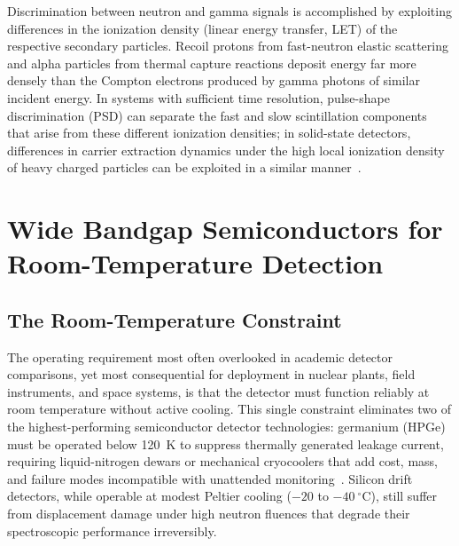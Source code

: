 Discrimination between neutron and gamma signals is accomplished
by exploiting differences in the ionization density (linear energy
transfer, LET) of the respective secondary particles.  Recoil protons
from fast-neutron elastic scattering and alpha particles from thermal
capture reactions deposit energy far more densely than the Compton
electrons produced by gamma photons of similar incident energy.  In
systems with sufficient time resolution, pulse-shape discrimination
(PSD) can separate the fast and slow scintillation components that
arise from these different ionization densities; in solid-state detectors,
differences in carrier extraction dynamics under the high local ionization
density of heavy charged particles can be exploited in a similar
manner~\cite{knoll2010}.

\section{Wide Bandgap Semiconductors for Room-Temperature Detection}
\label{sec:wide_bandgap}

\subsection{The Room-Temperature Constraint}

The operating requirement most often overlooked in academic detector
comparisons, yet most consequential for deployment in nuclear plants,
field instruments, and space systems, is that the detector must
function reliably at room temperature without active cooling.  This
single constraint eliminates two of the highest-performing semiconductor
detector technologies: germanium (HPGe) must be operated below 120~K
to suppress thermally generated leakage current, requiring liquid-nitrogen
dewars or mechanical cryocoolers that add cost, mass, and failure modes
incompatible with unattended monitoring~\cite{knoll2010}.  Silicon drift
detectors, while operable at modest Peltier cooling ($-20$ to
$-40~^\circ$C), still suffer from displacement damage under high neutron
fluences that degrade their spectroscopic performance irreversibly.

